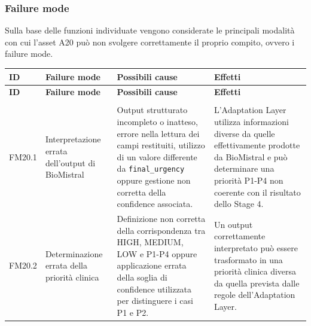 \subsubsection{Failure mode}
Sulla base delle funzioni individuate vengono considerate le principali modalità con cui l'asset A20 può non svolgere correttamente il proprio compito, ovvero i failure mode.

{
\small
{}
\setlength{\tabcolsep}{4pt}
\renewcommand{\arraystretch}{1.08}

\begin{xltabular}{\textwidth}{
    >{\raggedright\arraybackslash}p{1.1cm}
    >{\raggedright\arraybackslash}p{3cm}
    >{\raggedright\arraybackslash}p{5cm}
    X
}

\toprule

\textbf{ID} &
\textbf{Failure mode} &
\textbf{Possibili cause} &
\textbf{Effetti} \\

\midrule

\endfirsthead

\toprule

\textbf{ID} &
\textbf{Failure mode} &
\textbf{Possibili cause} &
\textbf{Effetti} \\

\midrule

\endhead

 \\
\endfoot

\endlastfoot

        FM20.1 &
        Interpretazione errata dell'output di BioMistral &
        Output strutturato incompleto o inatteso, errore nella lettura
        dei campi restituiti, utilizzo di un valore differente da
        \texttt{final\_urgency} oppure gestione non corretta della
        confidence associata. &
        L'Adaptation Layer utilizza informazioni diverse da quelle
        effettivamente prodotte da BioMistral e può determinare una
        priorità P1-P4 non coerente con il risultato dello Stage 4. \\

        \midrule

        FM20.2 &
        Determinazione errata della priorità clinica &
        Definizione non corretta della corrispondenza tra HIGH, MEDIUM,
        LOW e P1-P4 oppure applicazione errata della soglia di confidence
        utilizzata per distinguere i casi P1 e P2. &
        Un output correttamente interpretato può essere trasformato in
        una priorità clinica diversa da quella prevista dalle regole
        dell'Adaptation Layer. \\


\end{xltabular}}
